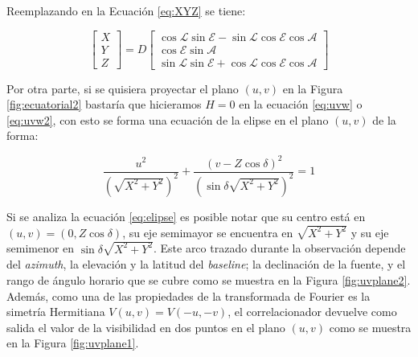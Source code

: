 Reemplazando en la Ecuación \ref{eq:XYZ} se tiene:

\begin{equation}
\begin{bmatrix}
X\\
Y\\
Z
\end{bmatrix}
=
D
\begin{bmatrix}
\cos{\mathscr{L}}\sin{\mathscr{E}}-\sin{\mathscr{L}}\cos{\mathscr{E}}\cos{\mathscr{A}}\\
\cos{\mathscr{E}}\sin{\mathscr{A}}\\
\sin{\mathscr{L}}\sin{\mathscr{E}}+\cos{\mathscr{L}}\cos{\mathscr{E}}\cos{\mathscr{A}}
\end{bmatrix}
\end{equation}


Por otra parte, si se quisiera proyectar el plano $(u,v)$ en la Figura \ref{fig:ecuatorial2} bastaría que hicieramos $H=0$ en la ecuación \ref{eq:uvw} o \ref{eq:uvw2}, con esto se forma una ecuación de la elipse en el plano $(u,v)$ de la forma:

\begin{equation}
\frac{u^2}{(\sqrt{X^{2}+Y^{2}})^2}+\frac{(v-Z\cos{\delta})^2}{(\sin{\delta}\sqrt{X^{2}+Y^{2}})^2} = 1
\label{eq:elipse}
\end{equation}

Si se analiza la ecuación \ref{eq:elipse} es posible notar que su centro está en $(u,v)=(0,Z\cos{\delta})$, su eje semimayor se encuentra en $\sqrt{X^{2}+Y^{2}}$ y su eje semimenor en $\sin{\delta}\sqrt{X^{2}+Y^{2}}$. Este arco trazado durante la observación depende del \textit{azimuth}, la elevación y la latitud del \textit{baseline}; la declinación de la fuente, y el rango de ángulo horario que se cubre como se muestra en la Figura \ref{fig:uvplane2}. Además, como una de las propiedades de la transformada de Fourier es la simetría Hermitiana $V(u,v)=V(-u,-v)$, el correlacionador devuelve como salida el valor de la visibilidad en dos puntos en el plano $(u,v)$ como se muestra en la Figura \ref{fig:uvplane1}.

